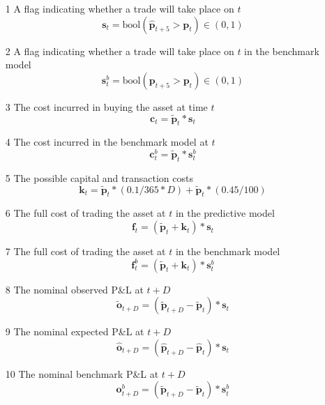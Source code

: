 \documentclass[a4paper,11pt,oneside]{article}
\theoremstyle{plain}
\theoremstyle{definition}
\begin{document}
	\begin{itemize}
		\item [1] A flag indicating whether a trade will take place on $t$
		\begin{equation}
				\mathbf{s}_t = \mathrm{bool}(\mathbf{\hat{p}}_{t+5} > \mathbf{p}_t) \in (0, 1)
		\end{equation}
		\item [2] A flag indicating whether a trade will take place on $t$ in the benchmark model
		\begin{equation}
				\mathbf{s}^b_{t} = \mathrm{bool}({\mathbf{p}}_{t+5} > \mathbf{p}_t) \in (0, 1)
		\end{equation}
		
		\item [3] The cost incurred in buying the asset at time $t$
		\begin{equation}
			\mathbf{c}_t = \mathbf{\tilde{p}}_t * \mathbf{s}_t
		\end{equation}
		\item [4] The cost incurred in the benchmark model at $t$
		\begin{equation}
				\mathbf{c}^b_{t} = \mathbf{\tilde{p}}_t * \mathbf{s}^b_{t}
		\end{equation}
		\item [5] The possible capital and transaction costs
		\begin{equation}
			\mathbf{k}_t= \mathbf{\tilde{p}}_t * (0.1 / 365 * D) + \mathbf{\tilde{p}}_t * (0.45 / 100)
		\end{equation}
		\item [6] The full cost of trading the asset at $t$ in the predictive model
		\begin{equation}
			\mathbf{f}_t = (\mathbf{\tilde{p}}_t + \mathbf{k}_t) * \mathbf{s}_t
		\end{equation}	
		\item [7] The full cost of trading the asset at $t$ in the benchmark model
		\begin{equation}
			\mathbf{f}^b_{t} = (\mathbf{\tilde{p}}_t + \mathbf{k}_t) * \mathbf{s}^b_{t}
		\end{equation}
		
		
		\item [8] The nominal observed P\&L at $t+D$
		\begin{equation}
			\mathbf{\tilde{o}}_{t + D} = \left( \mathbf{\tilde{p}}_{t+D} - \mathbf{\tilde{p}}_t \right) * \mathbf{s}_t
		\end{equation}	
		\item [9] The nominal expected P\&L at $t+D$
		\begin{equation}
		\mathbf{\hat{o}}_{t + D} = \left( \mathbf{\hat{p}}_{t+D} - \mathbf{\hat{p}}_t \right ) * \mathbf{s}_t
		\end{equation}
		\item [10] The nominal benchmark P\&L at $t+D$
		\begin{equation}
			\mathbf{o}^b_{t + D} = \left( \mathbf{\tilde{p}}_{t+D} - \mathbf{\tilde{p}}_t \right) * \mathbf{s}^b_{t}
		\end{equation}
		

\end{itemize}
\end{document}

